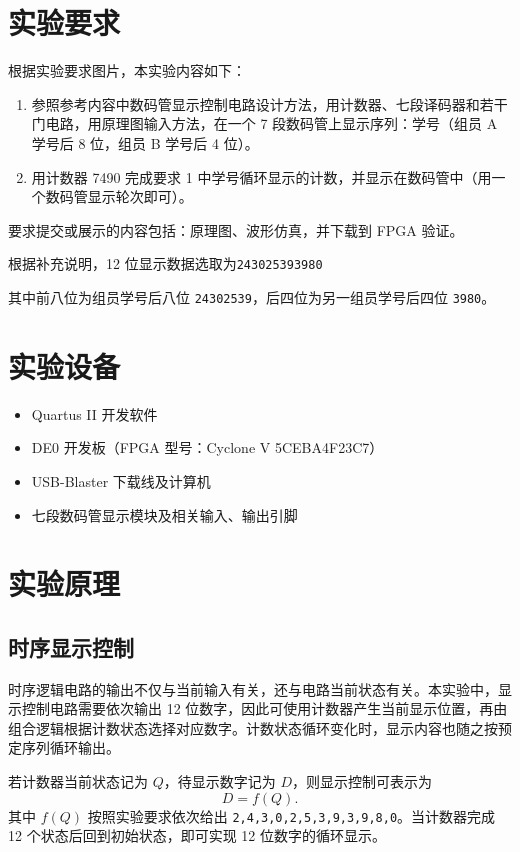 \documentclass[12pt]{ctexart}
\begin{document}
\section{实验要求}

根据实验要求图片，本实验内容如下：

\begin{enumerate}
    \item 参照参考内容中数码管显示控制电路设计方法，用计数器、七段译码器和若干门电路，用原理图输入方法，在一个 7 段数码管上显示序列：学号（组员 A 学号后 8 位，组员 B 学号后 4 位）。
    \item 用计数器 7490 完成要求 1 中学号循环显示的计数，并显示在数码管中（用一个数码管显示轮次即可）。
\end{enumerate}

要求提交或展示的内容包括：原理图、波形仿真，并下载到 FPGA 验证。

根据补充说明，12 位显示数据选取为\texttt{243025393980}

其中前八位为组员学号后八位 \texttt{24302539}，后四位为另一组员学号后四位 \texttt{3980}。

\section{实验设备}

\begin{itemize}
    \item Quartus II 开发软件
    \item DE0 开发板（FPGA 型号：Cyclone V 5CEBA4F23C7）
    \item USB-Blaster 下载线及计算机
    \item 七段数码管显示模块及相关输入、输出引脚
\end{itemize}

\section{实验原理}

\subsection{时序显示控制}

时序逻辑电路的输出不仅与当前输入有关，还与电路当前状态有关。本实验中，显示控制电路需要依次输出 12 位数字，因此可使用计数器产生当前显示位置，再由组合逻辑根据计数状态选择对应数字。计数状态循环变化时，显示内容也随之按预定序列循环输出。

若计数器当前状态记为 $Q$，待显示数字记为 $D$，则显示控制可表示为
\[
    D = f(Q).
\]
其中 $f(Q)$ 按照实验要求依次给出 \texttt{2,4,3,0,2,5,3,9,3,9,8,0}。当计数器完成 12 个状态后回到初始状态，即可实现 12 位数字的循环显示。
\end{document}

